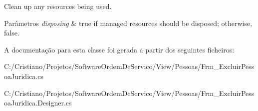 Clean up any resources being used. 


\begin{DoxyParams}{Parâmetros}
{\em disposing} & true if managed resources should be disposed; otherwise, false.\\
\hline
\end{DoxyParams}


A documentação para esta classe foi gerada a partir dos seguintes ficheiros\+:\begin{DoxyCompactItemize}
\item 
C\+:/\+Cristiano/\+Projetos/\+Software\+Ordem\+De\+Servico/\+View/\+Pessoas/Frm\+\_\+\+Excluir\+Pessoa\+Juridica.\+cs\item 
C\+:/\+Cristiano/\+Projetos/\+Software\+Ordem\+De\+Servico/\+View/\+Pessoas/Frm\+\_\+\+Excluir\+Pessoa\+Juridica.\+Designer.\+cs\end{DoxyCompactItemize}
